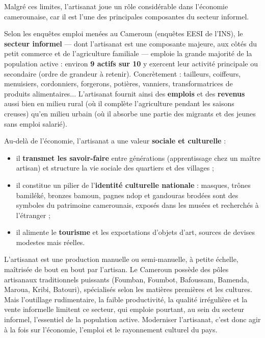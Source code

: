 \documentclass[11pt]{article}
\newcommand{\cle}[1]{{\popxbold\color{popdark}#1}}
\newcounter{popsec}
\newcounter{popsub}
\newcommand{\courssub}[1]{%
  \stepcounter{popsub}%
  \par\vspace{9pt}\noindent{\popxbold\fontsize{11.5}{13}\selectfont\color{popink}{\color{poporange}\thepopsec.\thepopsub}\hspace{6pt}#1}\par\nopagebreak\vspace{4pt}
}
\begin{document}
\courssub{Le poids économique et social du secteur}

Malgré ces limites, l'artisanat joue un rôle considérable dans l'économie camerounaise, car il est l'une des principales composantes du \cle{secteur informel}.

\begin{exemplebox}
Selon les enquêtes emploi menées au Cameroun (enquêtes EESI de l'INS), le \textbf{secteur informel} — dont l'artisanat est une composante majeure, aux côtés du petit commerce et de l'agriculture familiale — emploie la grande majorité de la population active : environ \textbf{9 actifs sur 10} y exercent leur activité principale ou secondaire (ordre de grandeur à retenir). Concrètement : tailleurs, coiffeurs, menuisiers, cordonniers, forgerons, potières, vanniers, transformatrices de produits alimentaires... L'artisanat fournit ainsi des \textbf{emplois} et des \textbf{revenus} aussi bien en milieu rural (où il complète l'agriculture pendant les saisons creuses) qu'en milieu urbain (où il absorbe une partie des migrants et des jeunes sans emploi salarié).
\end{exemplebox}

Au-delà de l'économie, l'artisanat a une valeur \textbf{sociale et culturelle} :

\begin{itemize}
\item il \textbf{transmet les savoir-faire} entre générations (apprentissage chez un maître artisan) et structure la vie sociale des quartiers et des villages ;
\item il constitue un pilier de l'\textbf{identité culturelle nationale} : masques, trônes bamiléké, bronzes bamoun, pagnes ndop et gandouras brodées sont des symboles du patrimoine camerounais, exposés dans les musées et recherchés à l'étranger ;
\item il alimente le \textbf{tourisme} et les exportations d'objets d'art, sources de devises modestes mais réelles.
\end{itemize}

\begin{aretenir}[L'essentiel]
L'artisanat est une production manuelle ou semi-manuelle, à petite échelle, maîtrisée de bout en bout par l'artisan. Le Cameroun possède des pôles artisanaux traditionnels puissants (Foumban, Foumbot, Bafoussam, Bamenda, Maroua, Kribi, Batouri), spécialisés selon les matières premières et les cultures. Mais l'outillage rudimentaire, la faible productivité, la qualité irrégulière et la vente informelle limitent ce secteur, qui emploie pourtant, au sein du secteur informel, l'essentiel de la population active. Moderniser l'artisanat, c'est donc agir à la fois sur l'économie, l'emploi et le rayonnement culturel du pays.
\end{aretenir}
\end{document}
